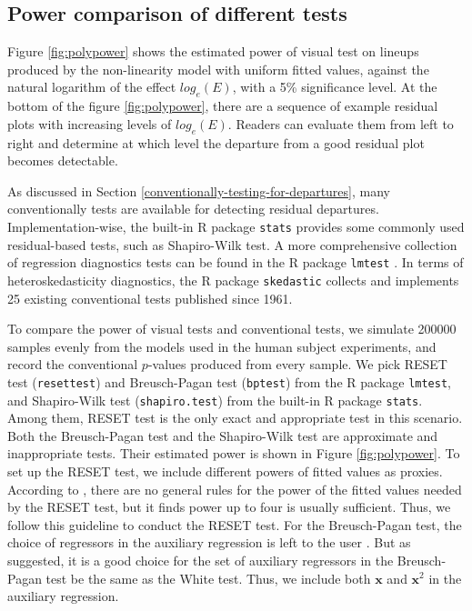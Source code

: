 \documentclass[]{interact}
\theoremstyle{plain}%
\theoremstyle{definition}
\theoremstyle{remark}
\begin{document}
\hypertarget{power-comparison-of-different-tests}{%
\subsection{Power comparison of different
tests}\label{power-comparison-of-different-tests}}

Figure \ref{fig:polypower} shows the estimated power of visual test on
lineups produced by the non-linearity model with uniform fitted values,
against the natural logarithm of the effect \(log_e(E)\), with a 5\%
significance level. At the bottom of the figure \ref{fig:polypower},
there are a sequence of example residual plots with increasing levels of
\(log_e(E)\). Readers can evaluate them from left to right and determine
at which level the departure from a good residual plot becomes
detectable.

As discussed in Section \ref{conventionally-testing-for-departures},
many conventionally tests are available for detecting residual
departures. Implementation-wise, the built-in R package \texttt{stats}
provides some commonly used residual-based tests, such as Shapiro-Wilk
test. A more comprehensive collection of regression diagnostics tests
can be found in the R package \texttt{lmtest} \citep{lmtest}. In terms
of heteroskedasticity diagnostics, the R package \texttt{skedastic}
\citep{skedastic} collects and implements 25 existing conventional tests
published since 1961.

To compare the power of visual tests and conventional tests, we simulate
200000 samples evenly from the models used in the human subject
experiments, and record the conventional \(p\)-values produced from
every sample. We pick RESET test (\texttt{resettest}) and Breusch-Pagan
test (\texttt{bptest}) from the R package \texttt{lmtest}, and
Shapiro-Wilk test (\texttt{shapiro.test}) from the built-in R package
\texttt{stats}. Among them, RESET test is the only exact and appropriate
test in this scenario. Both the Breusch-Pagan test and the Shapiro-Wilk
test are approximate and inappropriate tests. Their estimated power is
shown in Figure \ref{fig:polypower}. To set up the RESET test, we
include different powers of fitted values as proxies. According to
\citet{ramsey_tests_1969}, there are no general rules for the power of
the fitted values needed by the RESET test, but it finds power up to
four is usually sufficient. Thus, we follow this guideline to conduct
the RESET test. For the Breusch-Pagan test, the choice of regressors in
the auxiliary regression is left to the user
\citep{breusch_simple_1979}. But as \citet{waldman1983note} suggested,
it is a good choice for the set of auxiliary regressors in the
Breusch-Pagan test be the same as the White test. Thus, we include both
\(\boldsymbol{x}\) and \(\boldsymbol{x}^2\) in the auxiliary regression.
\end{document}
